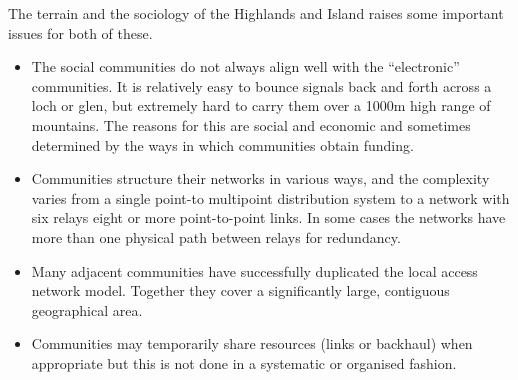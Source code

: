 The terrain and the sociology of the Highlands and Island raises some important issues for both of these.
\begin{itemize}
\item The social communities do not always align well with the
  ``electronic'' communities. It is relatively easy to bounce signals
  back and forth across a loch or glen, but extremely hard to carry
  them over a 1000m high range of mountains. The reasons for this are
  social and economic and sometimes determined by the ways in which
  communities obtain funding.%
\item Communities structure their networks in various ways, and the
  complexity varies from a single point-to multipoint distribution
  system to a network with six relays  eight or more point-to-point
  links.  In some cases the networks have more than one physical path
  between relays for redundancy. 
\item Many adjacent communities have successfully duplicated the local
  access network model. Together they cover a significantly large,
  contiguous geographical area.
\item Communities may temporarily share resources (links or backhaul)
  when appropriate but this is not done in a systematic or organised
  fashion.
\end{itemize}

